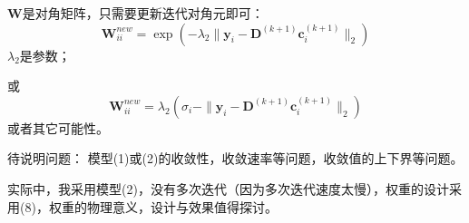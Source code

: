 \documentclass[10pt,twocolumn,letterpaper]{article}
\begin{document}
$\mathbf{W}$是对角矩阵，只需要更新迭代对角元即可：
\begin{equation}
\mathbf{W}_{ii}^{new}=\exp(-\lambda_{2}\|\mathbf{y}_{i}-\mathbf{D}^{(k+1)}\mathbf{c}_{i}^{(k+1)}\|_{2})
\end{equation}
$\lambda_{2}$是参数；

或
\begin{equation}
\mathbf{W}_{ii}^{new}=\lambda_{2}(\sigma_{i}-\|\mathbf{y}_{i}-\mathbf{D}^{(k+1)}\mathbf{c}_{i}^{(k+1)}\|_{2})
\end{equation}
或者其它可能性。

待说明问题：
模型(1)或(2)的收敛性，收敛速率等问题，收敛值的上下界等问题。

实际中，我采用模型(2)，没有多次迭代（因为多次迭代速度太慢），权重的设计采用(8)，权重的物理意义，设计与效果值得探讨。





{\small


}
\end{document}

